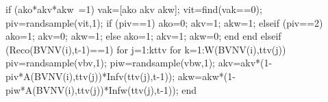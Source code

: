                                                                 if (ako*akv*akw~=1)
                                                                       vak=[ako akv akw];
                                                                       vit=find(vak==0); 
                                                                       piv=randsample(vit,1);
                                                                       if (piv==1)
                                                                            ako=0;
                                                                            akv=1;
                                                                            akw=1;
                                                                       elseif (piv==2)
                                                                            ako=1;
                                                                            akv=0;
                                                                            akw=1;
                                                                       else 
                                                                            ako=1;
                                                                            akv=1;
                                                                            akw=0;
                                                                       end                                                                       
                                                                end
                                          elseif (Reco(BVNV(i),t-1)==1)                                                 
                                                   for j=1:kttv                                                                                                  
                                                          for k=1:W(BVNV(i),ttv(j))                                                               
                                                                piv=randsample(vbv,1);
                                                                piw=randsample(vbw,1);
                                                                akv=akv*(1-piv*A(BVNV(i),ttv(j))*Infv(ttv(j),t-1));
                                                                akw=akw*(1-piw*A(BVNV(i),ttv(j))*Infw(ttv(j),t-1));                                                                 
                                                          end
                                                                                                                                                                          
